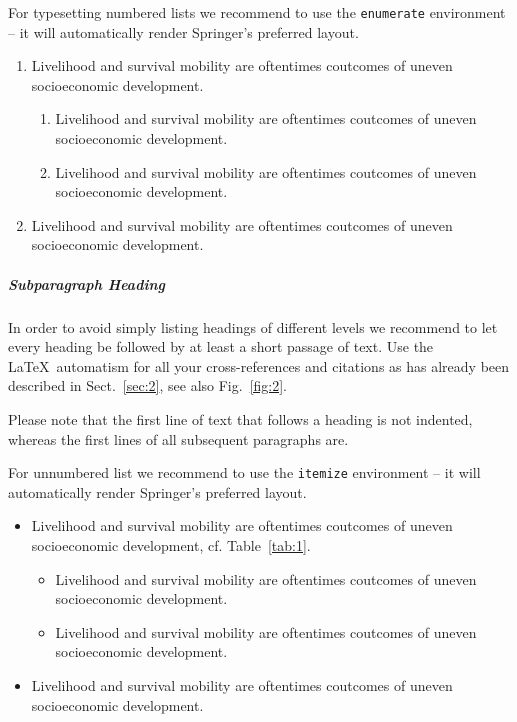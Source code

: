For typesetting numbered lists we recommend to use the \verb|enumerate| environment -- it will automatically render Springer's preferred layout.

\begin{enumerate}
    \item{Livelihood and survival mobility are oftentimes coutcomes of uneven socioeconomic development.}
          \begin{enumerate}
              \item{Livelihood and survival mobility are oftentimes coutcomes of uneven socioeconomic development.}
              \item{Livelihood and survival mobility are oftentimes coutcomes of uneven socioeconomic development.}
          \end{enumerate}
    \item{Livelihood and survival mobility are oftentimes coutcomes of uneven socioeconomic development.}
\end{enumerate}


\subparagraph{Subparagraph Heading} In order to avoid simply listing headings of different levels we recommend to let every heading be followed by at least a short passage of text. Use the \LaTeX\ automatism for all your cross-references and citations as has already been described in Sect.~\ref{sec:2}, see also Fig.~\ref{fig:2}.

Please note that the first line of text that follows a heading is not indented, whereas the first lines of all subsequent paragraphs are.

For unnumbered list we recommend to use the \verb|itemize| environment -- it will automatically render Springer's preferred layout.

\begin{itemize}
    \item{Livelihood and survival mobility are oftentimes coutcomes of uneven socioeconomic development, cf. Table~\ref{tab:1}.}
          \begin{itemize}
              \item{Livelihood and survival mobility are oftentimes coutcomes of uneven socioeconomic development.}
              \item{Livelihood and survival mobility are oftentimes coutcomes of uneven socioeconomic development.}
          \end{itemize}
    \item{Livelihood and survival mobility are oftentimes coutcomes of uneven socioeconomic development.}
\end{itemize}

